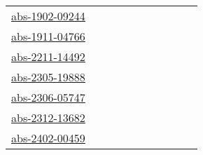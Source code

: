 {\begin{longtable}{p{3cm}p{4cm}p{2cm}p{2cm}p{2cm}p{2cm}p{2cm}p{2cm}p{2cm}p{2cm}}
\href{articles/abs-1902-09244.pdf}{abs-1902-09244}~\cite{abs-1902-09244} &  &  &  &  &  &  &  &  & \\
\href{articles/abs-1911-04766.pdf}{abs-1911-04766}~\cite{abs-1911-04766} &  &  &  &  &  &  &  &  & \\
\href{articles/abs-2211-14492.pdf}{abs-2211-14492}~\cite{abs-2211-14492} &  &  &  &  &  &  &  &  & \\
\href{articles/abs-2305-19888.pdf}{abs-2305-19888}~\cite{abs-2305-19888} &  &  &  &  &  &  &  &  & \\
\href{articles/abs-2306-05747.pdf}{abs-2306-05747}~\cite{abs-2306-05747} &  &  &  &  &  &  &  &  & \\
\href{articles/abs-2312-13682.pdf}{abs-2312-13682}~\cite{abs-2312-13682} &  &  &  &  &  &  &  &  & \\
\href{articles/abs-2402-00459.pdf}{abs-2402-00459}~\cite{abs-2402-00459} &  &  &  &  &  &  &  &  & \\
\end{longtable}
}

